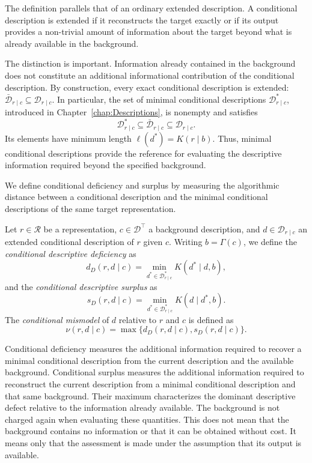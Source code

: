 The definition parallels that of an ordinary extended description. A conditional description is extended if it reconstructs the target exactly or if its output provides a non-trivial amount of information about the target beyond what is already available in the background.

The distinction is important. Information already contained in the background does not constitute an additional informational contribution of the conditional description. By construction, every exact conditional description is extended: $\bar{\mathcal D}_{r\mid c} \subseteq \mathcal D_{r\mid c}$. In particular, the set of minimal conditional descriptions $\mathcal D_{r\mid c}^\ast$, introduced in Chapter~\ref{chap:Descriptions}, is nonempty and satisfies
\[
\mathcal D_{r\mid c}^\ast \subseteq \bar{\mathcal D}_{r\mid c} \subseteq \mathcal D_{r\mid c}.
\]
Its elements have minimum length $\ell(d^\ast)=K(r\mid b)$. Thus, minimal conditional descriptions provide the
reference for evaluating the descriptive information required beyond the specified background.

We define conditional deficiency and surplus by measuring the algorithmic distance between a conditional description and the minimal conditional descriptions of the same target representation.

\begin{definition}
\label{def:conditional_mismodel}
Let $r\in\mathcal R$ be a representation, $c\in\mathcal D^\top$ a background description, and $d\in\mathcal D_{r\mid c}$ an extended conditional description of $r$ given $c$. Writing $b=\Gamma(c)$, we define the
\emph{conditional descriptive deficiency}  as
\[
d_D(r,d\mid c) = \min_{d^\ast\in\mathcal D_{r\mid c}^\ast} K(d^\ast\mid d,b),
\]
and the \emph{conditional descriptive surplus}  as
\[
s_D(r,d\mid c) = \min_{d^\ast\in\mathcal D_{r\mid c}^\ast} K(d\mid d^\ast,b).
\]
The \emph{conditional mismodel}  of $d$ relative to $r$ and $c$ is defined as
\[
\nu(r,d\mid c) = \max\{d_D(r,d\mid c),s_D(r,d\mid c)\}.
\]
\end{definition}

Conditional deficiency measures the additional information required to recover a minimal conditional description from the current description and the available background. Conditional surplus measures the additional information required to reconstruct the current description from a minimal conditional description and that same background. Their maximum characterizes the dominant descriptive defect relative to the information already available. The background is not charged again when evaluating these quantities. This does not mean that the background contains no information or that it can be obtained without cost. It means only that the assessment is made under the assumption that its output is available.

